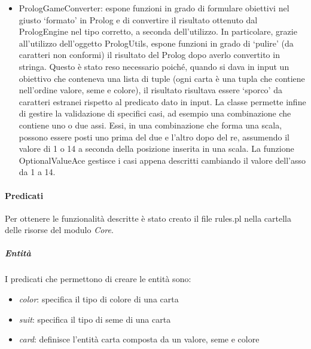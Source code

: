\begin{itemize}
    \item PrologGameConverter: espone funzioni in grado di formulare obiettivi nel giusto ‘formato’ in Prolog e di convertire il risultato ottenuto dal PrologEngine nel tipo corretto, a seconda dell’utilizzo.
    In particolare, grazie all’utilizzo dell’oggetto PrologUtils, espone funzioni in grado di ‘pulire’ (da caratteri non conformi) il risultato del Prolog dopo averlo convertito in stringa.
    Questo è stato reso necessario poiché, quando si dava in input un obiettivo che conteneva una lista di tuple (ogni carta è una tupla che contiene nell’ordine valore, seme e colore), il risultato risultava essere ‘sporco’ da caratteri estranei rispetto al predicato dato in input.
    La classe permette infine di gestire la validazione di specifici casi, ad esempio una combinazione che contiene uno o due assi.
    Essi, in una combinazione che forma una scala, possono essere posti uno prima del due e l’altro dopo del re, assumendo il valore di 1 o 14 a seconda della posizione inserita in una scala.
    La funzione OptionalValueAce gestisce i casi appena descritti cambiando il valore dell’asso da 1 a 14.
\end{itemize}

\paragraph{Predicati}
Per ottenere le funzionalità descritte è stato creato il file rules.pl nella cartella delle risorse del modulo \textit{Core}.

\subparagraph{Entità} I predicati che permettono di creare le entità sono:
\begin{itemize}
    \item \textit{color}: specifica il tipo di colore di una carta
    \item \textit{suit}: specifica il tipo di seme di una carta
    \item \textit{card}: definisce l’entità carta composta da un valore, seme e colore
\end{itemize}

